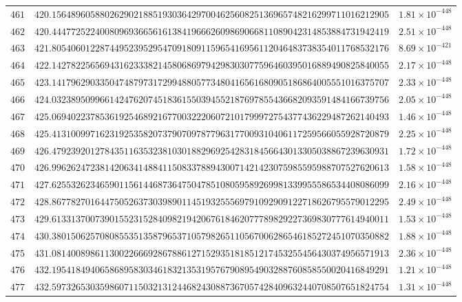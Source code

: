 \documentclass[12pt,reqno]{amsart}
\theoremstyle{remark}
\begin{document}
\begin{longtable}{clc}
$461$ & $420.1564896058802629021885193036429700462560825136965748216299711016212905$ & $1.81\times 10^{-448}$ \\
$462$ & $420.4447725224008096936656161384196662609869066811089042314853884731942419$ & $2.51\times 10^{-448}$ \\
$463$ & $421.8054060122874495239529547091809115965416956112046483738354011768532176$ & $8.69\times 10^{-421}$ \\
$464$ & $422.1427822565694316233382145806869794298303077596460395016889490825840055$ & $2.17\times 10^{-448}$ \\
$465$ & $423.1417962903350474879731729948805773480416561680905186864005551016375707$ & $2.33\times 10^{-448}$ \\
$466$ & $424.0323895099661424762074518361550394552187697855436682093591484166739756$ & $2.05\times 10^{-448}$ \\
$467$ & $425.0694022378536192546892167700322206072101799972754377436229487262140493$ & $1.46\times 10^{-448}$ \\
$468$ & $425.4131009971623192535820737907097877963177009310406117259566055928720879$ & $2.25\times 10^{-448}$ \\
$469$ & $426.4792392012784351163532381030188296925428318456643013305038867239630931$ & $1.72\times 10^{-448}$ \\
$470$ & $426.9962624723814206341488411508337889430071421423075985595988707527620613$ & $1.58\times 10^{-448}$ \\
$471$ & $427.6255326234659011561446873647504785108059589269981339955586534408086099$ & $2.16\times 10^{-448}$ \\
$472$ & $428.8677827016447505263730398901145193255569791092909122718626795579012295$ & $2.49\times 10^{-448}$ \\
$473$ & $429.6133137007390155231528409821942067618462077789829227369830777614940011$ & $1.53\times 10^{-448}$ \\
$474$ & $430.3801506257080855351358796537105798265110567006286546185272451070350882$ & $1.88\times 10^{-448}$ \\
$475$ & $431.0814008986113002266692867886127152935181851217453255456430374956571913$ & $2.36\times 10^{-448}$ \\
$476$ & $432.1954184940658689583034618321353195767908954903288760858550020416849291$ & $1.21\times 10^{-448}$ \\
$477$ & $432.5973265303598607115032131244682430887367057428409632440708507651824754$ & $1.31\times 10^{-448}$ \\

\end{longtable}
\end{document}
